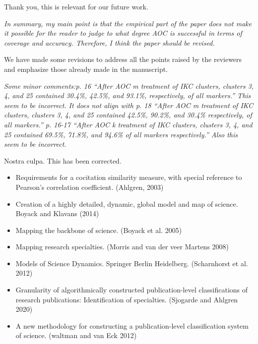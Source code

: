 \documentclass[11pt, oneside]{article}   	%
\begin{document}
 \vspace{2 mm} 
 Thank you, this is relevant for our future work. 

\vspace{2 mm} 
 \emph{In summary, my main point is that the empirical part of the paper does not make it possible for the reader to judge to what degree AOC is successful in terms of coverage and accuracy. Therefore, I think the paper should be revised.}  
 
 \vspace{2 mm} 
 We have made some revisions to address all the points raised by the reviewers and emphasize those already made in the manuscript.

\vspace{2 mm} 
 \emph{Some minor comments:p. 16 “After AOC m treatment of IKC clusters, clusters 3, 4, and 25 contained 30.4\%, 42.5\%, and 93.1\%, respectively, of all markers.” This seem to be incorrect. It does not align with p. 18 “After AOC m treatment of IKC clusters, clusters 3, 4, and 25 contained 42.5\%, 90.2\%, and 30.4\% respectively, of all markers.” p. 16-17 “After AOC k treatment of IKC clusters, clusters 3, 4, and 25 contained 69.5\%, 71.8\%, and 94.6\% of all markers respectively.” Also this seem to be incorrect.}
 
 \vspace{2 mm} 
Nostra culpa. This has been corrected. 

\begin{itemize}
\item Requirements for a cocitation similarity measure, with special reference to Pearson’s correlation coefficient. (Ahlgren, 2003)
\item Creation of a highly detailed, dynamic, global model and map of science. Boyack and Klavans (2014)
\item Mapping the backbone of science. (Boyack et al. 2005) 
\item Mapping research specialties. (Morris and van der veer Martens 2008)
\item Models of Science Dynamics. Springer Berlin Heidelberg. (Scharnhorst et al. 2012)
\item Granularity of algorithmically constructed publication-level classifications of research publications: Identification of specialties. (Sjogarde and Ahlgren 2020)
\item A new methodology for constructing a publication-level classification system of science. (waltman and van Eck 2012)
\end{itemize}
\end{document}

